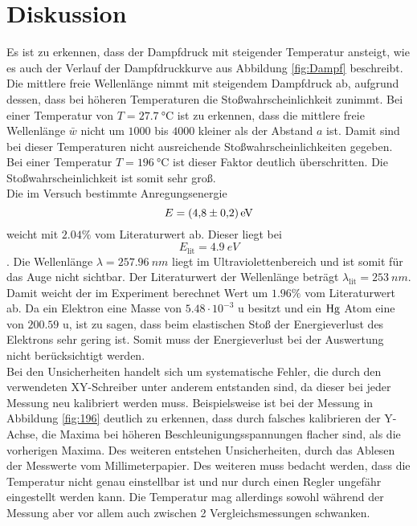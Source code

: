 \section{Diskussion}
\label{sec:Diskussion}

Es ist zu erkennen, dass der Dampfdruck mit steigender Temperatur ansteigt, wie es auch der Verlauf der Dampfdruckkurve aus Abbildung \ref{fig:Dampf} beschreibt.
Die mittlere freie Wellenlänge nimmt mit steigendem Dampfdruck ab, aufgrund dessen, dass bei höheren Temperaturen
die Stoßwahrscheinlichkeit zunimmt.
Bei einer Temperatur von $T = \qty{27.7}{\degreeCelsius}$ ist zu erkennen, dass die mittlere freie Wellenlänge $\bar{w}$
nicht um $1000$ bis $4000$ kleiner als der Abstand $a$ ist.
Damit sind bei dieser Temperaturen nicht ausreichende Stoßwahrscheinlichkeiten gegeben.
Bei einer Temperatur $T = \qty{196}{\degreeCelsius}$ ist dieser Faktor deutlich überschritten.
Die Stoßwahrscheinlichkeit ist somit sehr groß.\\


\noindent Die im Versuch bestimmte Anregungsenergie 
\begin{equation*}
    E = \qty{4.8 \pm 0.2}{eV}
\end{equation*}
weicht mit $2.04 \%$ vom Literaturwert ab.
Dieser liegt bei 
\begin{equation*}
    E_\text{lit} = \qty{4.9}{eV}
\end{equation*}
\cite{EAnregung}.
Die Wellenlänge $\lambda = \qty{257.96}{nm}$ liegt im Ultraviolettenbereich und ist somit für das Auge nicht sichtbar.
Der Literaturwert der Wellenlänge beträgt $\lambda_\text{lit} = \qty{253}{nm}$.
Damit weicht der im Experiment berechnet Wert um $1.96 \%$ vom Literaturwert ab.
Da ein Elektron eine Masse von $5.48 \cdot 10^{-3}$ u besitzt und ein $\ce{Hg}$ Atom eine von $200.59$ u,
ist zu sagen, dass beim elastischen Stoß der Energieverlust des Elektrons sehr gering ist.
Somit muss der Energieverlust bei der Auswertung nicht berücksichtigt werden.\\

\noindent Bei den Unsicherheiten handelt sich um systematische Fehler, die durch den verwendeten XY-Schreiber unter anderem
entstanden sind, da dieser bei jeder Messung neu kalibriert werden muss.
Beispielsweise ist bei der Messung in Abbildung \ref{fig:196} deutlich zu erkennen, dass durch falsches kalibrieren der Y-Achse,
die Maxima bei höheren Beschleunigungsspannungen flacher sind, als die vorherigen Maxima.
Des weiteren entstehen Unsicherheiten, durch das Ablesen der Messwerte vom Millimeterpapier.
Des weiteren muss bedacht werden, dass die Temperatur nicht genau einstellbar ist und nur durch einen Regler ungefähr eingestellt werden kann.
Die Temperatur mag allerdings sowohl während der Messung aber vor allem auch zwischen 2 Vergleichsmessungen schwanken.





